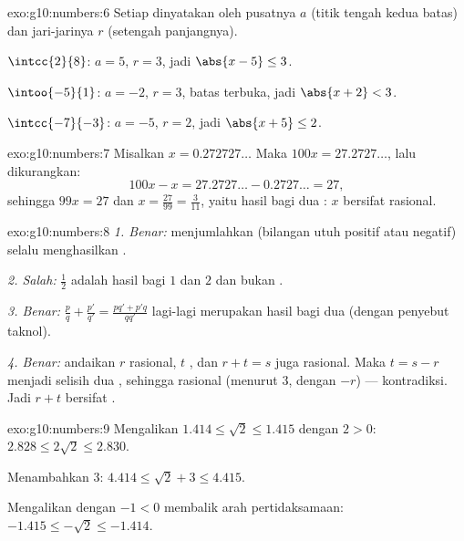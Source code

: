 \begin{solution}{exo:g10:numbers:6}
Setiap  dinyatakan oleh pusatnya $a$ (titik tengah kedua batas) dan
jari-jarinya $r$ (setengah panjangnya).

$\intcc{2}{8}$: $a = 5$, $r = 3$, jadi $\abs{x - 5} \leq 3$.

$\intoo{-5}{1}$: $a = -2$, $r = 3$, batas terbuka, jadi $\abs{x + 2} < 3$.

$\intcc{-7}{-3}$: $a = -5$, $r = 2$, jadi $\abs{x + 5} \leq 2$.
\end{solution}

\begin{solution}{exo:g10:numbers:7}
Misalkan $x = 0.272727\dots$ Maka $100x = 27.2727\dots$, lalu dikurangkan:
\[
100x - x = 27.2727\dots - 0.2727\dots = 27,
\]
sehingga $99x = 27$ dan $x = \frac{27}{99} = \frac{3}{11}$, yaitu hasil bagi
dua : $x$ bersifat rasional.
\end{solution}

\begin{solution}{exo:g10:numbers:8}
\emph{1. Benar:} menjumlahkan  (bilangan utuh positif atau
negatif) selalu menghasilkan .

\emph{2. Salah:} $\frac{1}{2}$ adalah hasil bagi  $1$ dan $2$
dan bukan .

\emph{3. Benar:} $\frac pq + \frac{p'}{q'} = \frac{pq' + p'q}{qq'}$ lagi-lagi
merupakan hasil bagi dua  (dengan penyebut taknol).

\emph{4. Benar:} andaikan $r$ rasional, $t$ , dan $r + t = s$
juga rasional. Maka $t = s - r$ menjadi selisih dua ,
sehingga rasional (menurut 3, dengan $-r$) --- kontradiksi. Jadi $r + t$
bersifat .
\end{solution}

\begin{solution}{exo:g10:numbers:9}
Mengalikan $1.414 \leq \sqrt2 \leq 1.415$ dengan $2 > 0$:
$2.828 \leq 2\sqrt2 \leq 2.830$.

Menambahkan $3$: $4.414 \leq \sqrt2 + 3 \leq 4.415$.

Mengalikan dengan $-1 < 0$ membalik arah pertidaksamaan:
$-1.415 \leq -\sqrt2 \leq -1.414$.
\end{solution}

